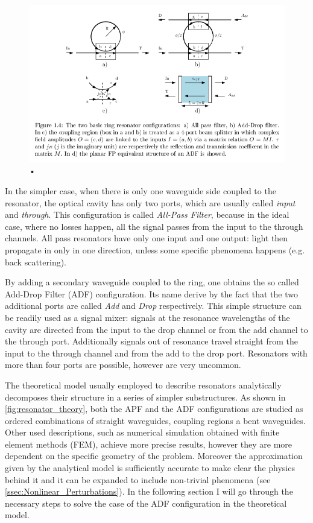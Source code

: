 \begin{figure}[ht]
	\centering
	\includegraphics[scale=.8]{figures/microring_theory.png}
	\caption{•}
	\label{fig:resonator_theory}
\end{figure}

In the simpler case, when there is only one waveguide side coupled to the resonator, the optical cavity has only two ports, which are usually called \textit{input} and \textit{through}.
This configuration is called \textit{All-Pass Filter}, because in the ideal case, where no losses happen, all the signal passes from the input to the through channels.
All pass resonators have only one input and one output: light then propagate in only in one direction, unless some specific phenomena happens (e.g. back scattering).

By adding a secondary waveguide coupled to the ring, one obtains the so called Add-Drop Filter (ADF) configuration.
Its name derive by the fact that the two additional ports are called \textit{Add} and \textit{Drop} respectively.
This simple structure can be readily used as a signal mixer: signals at the resonance wavelengths of the cavity are directed from the input to the drop channel or from the add channel to the through port.
Additionally signals out of resonance travel straight from the input to the through channel and from the add to the drop port.
Resonators with more than four ports are possible, however are very uncommon.

The theoretical model usually employed to describe resonators analytically decomposes their structure in a series of simpler substructures.
As shown in \autoref{fig:resonator_theory}, both the APF and the ADF configurations are studied as ordered combinations of straight waveguides, coupling regions a bent waveguides.
Other used descriptions, such as numerical simulation obtained with finite element methods (FEM), achieve more precise results, however they are more dependent on the specific geometry of the problem.
Moreover the approximation given by the analytical model is sufficiently accurate to make clear the physics behind it and it can be expanded to include non-trivial phenomena (see \autoref{ssec:Nonlinear_Perturbations}).
In the following section I will go through the necessary steps to solve the case of the ADF configuration in the theoretical model.

